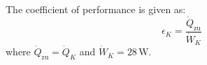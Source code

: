 The coefficient of performance is given as:  
\[
\epsilon_K = \frac{\dot{Q}_{\text{zu}}}{\dot{W}_K}
\]  
where \( \dot{Q}_{\text{zu}} = \dot{Q}_K \) and \( \dot{W}_K = 28 \, \text{W} \).